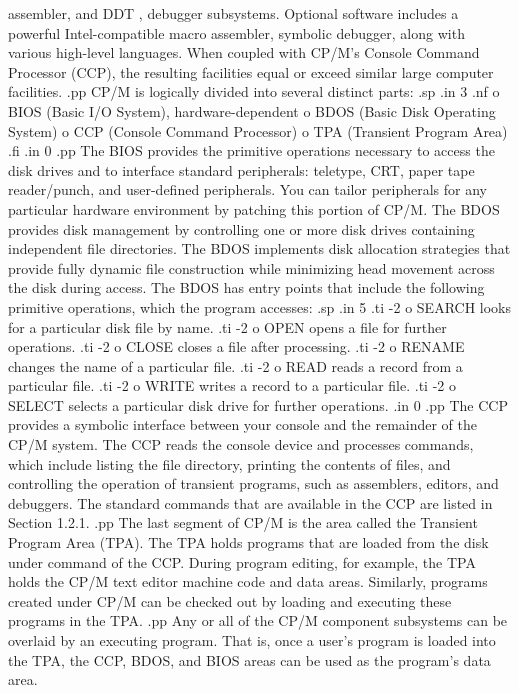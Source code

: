 assembler, and DDT , debugger subsystems.  Optional software includes a
powerful
Intel-compatible macro assembler, symbolic debugger, along with various
high-level languages.  When coupled with CP/M's Console Command 
Processor (CCP),
the resulting facilities equal or exceed similar large computer facilities.
.pp
CP/M is logically divided into several distinct parts:
.sp
.in 3
.nf
o BIOS (Basic I/O System), hardware-dependent
o BDOS (Basic Disk Operating System)
o CCP (Console Command Processor)
o TPA (Transient Program Area)
.fi
.in 0
.pp
The BIOS provides the primitive operations necessary to access the disk
drives and to interface standard peripherals:  teletype, CRT, paper tape
reader/punch, and user-defined peripherals.  You can tailor 
peripherals for any particular hardware environment by patching this
portion of
CP/M.  The BDOS provides disk management by controlling one or more disk
drives containing independent file directories.  The BDOS implements disk
allocation strategies that provide fully dynamic file construction while
minimizing head movement across the disk during access.  The BDOS has entry
points that include the following primitive operations, which the
program accesses:
.sp
.in 5
.ti -2
o SEARCH looks for a particular disk file by name.
.ti -2
o OPEN opens a file for further operations.
.ti -2
o CLOSE closes a file after processing.
.ti -2
o RENAME changes the name of a particular file.
.ti -2
o READ reads a record from a particular file.
.ti -2
o WRITE writes a record to a particular file.
.ti -2
o SELECT selects a particular disk drive for further operations.
.in 0
.pp
The CCP provides a symbolic interface between your console and the
remainder of the CP/M system.  The CCP reads the console device and
processes commands, which include listing the file directory, printing the
contents of files, and controlling the operation of transient programs, such
as assemblers, editors, and debuggers.  The standard commands that are
available in the CCP are listed in Section 1.2.1.
.pp
The last segment of CP/M is the area called the Transient Program
Area (TPA).  The TPA holds programs that are loaded from the disk under
command of the CCP.  During program editing, for example, the TPA holds
the CP/M text editor machine code and data areas.  Similarly, programs
created under CP/M can be checked out by loading and executing these
programs in the TPA.
.pp
Any or all of the CP/M component subsystems can be overlaid by an
executing program.  That is, once a user's program is loaded into the TPA,
the CCP, BDOS, and BIOS areas can be used as the program's data area.

